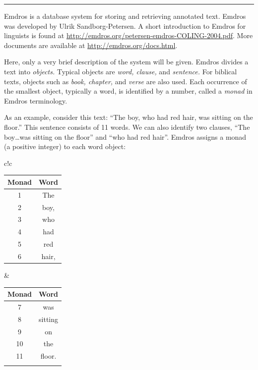 \documentclass[11pt,oneside,a4paper]{memoir}
\begin{document}
\plainbreak{3}

Emdros is a database system for storing and retrieving annotated text. Emdros was developed by Ulrik
Sandborg-Petersen. A short introduction to Emdros for linguists is
found at \url{http://emdros.org/petersen-emdros-COLING-2004.pdf}. More documents are available at
\url{http://emdros.org/docs.html}.

Here, only a very brief description of the system will be given. Emdros divides a text into
\emph{objects.} Typical objects are \emph{word, clause,} and
\emph{sentence.} For biblical texts, objects such as \emph{book, chapter,} and \emph{verse} are also
used. Each occurrence of the smallest object, typically a word, is identified by a number, called a
\emph{monad} in Emdros terminology.

As an example, consider this text: ``The boy, who had red hair, was sitting on the floor.'' This
sentence consists of 11 words. We can also identify two clauses, ``The boy\ldots was sitting on the
floor'' and ``who had red hair''. Emdros assigns a monad (a positive integer) to each word object:


\begin{center}
  \begin{tabular}{c!{\hspace{1cm}}c}
 
    \begin{tabular}{cc}
      \toprule
      \textbf{Monad} & \textbf{Word}\\
      \midrule
      1 & The  \\
      2 & boy, \\
      3 & who  \\
      4 & had  \\
      5 & red  \\
      6 & hair,\\
      \bottomrule
    \end{tabular}
 
    &
 
    \begin{tabular}{cc}
      \toprule
      \textbf{Monad} & \textbf{Word}\\
      \midrule
      7 & was\\
      8 & sitting\\
      9 & on\\
      10 & the\\
      11 & floor.\\
      &  \\
      \bottomrule
    \end{tabular}
 
  \end{tabular}
\end{center}
\end{document}
